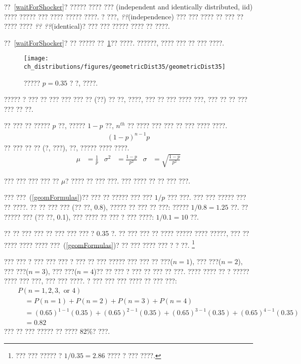 ??~\ref{waitForShocker}? ????? ???? ??? (independent and identically distributed, iid) ???? ????? ??? ???? ????? ????. ? ???, \emph{??}(independence) ??? ??? ???? ?? ??? ?? ???? ???? \emph{?? ??}(identical)? ??? ??? ????? ???? ?? ????.

??~\ref{waitForShocker}? ?? ????? ??~\ref{geometricDist35}?? ????. ??????, ???? ??? ?? ??? ????.

\begin{figure}
\centering
\texttt{[image: ch\_distributions/figures/geometricDist35/geometricDist35]}
\caption{????? $p=0.35$ ? ?, ????.}
\label{geometricDist35}
\end{figure}

????? ? ??? ?? ??? ??? ??? ?? (??) ?? ??, ????, ??? ?? ??? ???? ???, ??? ?? ?? ??? ??? ?? ??.

\begin{termBox}{
?? ??? ?? ????? $p$ ??, ????? $1-p$ ??, $n^{th}$ ?? ???? ??? ??? ?? ??? ???? ????.\vspace{-1.5mm}
\begin{eqnarray}
(1-p)^{n-1}p
\end{eqnarray}
?? ??? ?? ?? (?, ???), ??, ????? ???? ????.\vspace{-2.5mm}
\begin{align}
\mu &= \frac{1}{p}
	&\sigma^2&=\frac{1-p}{p^2}
	&\sigma &= \sqrt{\frac{1-p}{p^2}}
\label{geomFormulas}
\end{align}}
\end{termBox}

??? ??? ??? ??? ?? $\mu$? ???? ?? ??? ???. ??? ???? ?? ?? ??? ???.

??? ???~(\ref{geomFormulas})?? ??? ?? ????? ??? ??? $1/p$ ??? ???. ??? ??? ????? ??? ?? ????. ?? ?? ??? ??? (?? ??, 0.8), ????? ?? ??? ?? ???: ????? $1/0.8 = 1.25$ ??. ?? ????? ??? (?? ??, 0.1), ??? ???? ?? ??? ? ??? ????: $1/0.1 = 10$ ??.

\begin{exercise}
?? ?? ??? ??? ?? ??? ??? ??? ? 0.35 ?. ?? ??? ??? ?? ???? ????? ???? ?????, ??? ?? ???? ???? ???? ???~(\ref{geomFormulas})? ?? ??? ???? ??? ? ? ??.
\footnote{??? ??? ????? ? $1/0.35 = 2.86$ ???? ? ??? ????.}
\end{exercise}

\begin{example}{
??? ??? ? ??? ??? ??? ? ??? ?? ??? ?????} \label{marglimFirstSuccessIn4}
??? ??? ?? ???($n=1$), ??? ???($n=2$), ??? ???($n=3$), ??? ???($n=4$)?? ?? ??? ? ??? ?? ??? ?? ???. ???? ???? ?? ? ????? ???? ??? ???, ??? ??? ????. ? ??? ??? ??? ???? ?? ??? ???:
\begin{eqnarray*}
&&P(n=1, 2, 3,\text{ or }4) \\
	&& \quad = P(n=1)+P(n=2)+P(n=3)+P(n=4) \\
	&& \quad = (0.65)^{1-1}(0.35) + (0.65)^{2-1}(0.35) + (0.65)^{3-1}(0.35) + (0.65)^{4-1}(0.35) \\
	&& \quad = 0.82
\end{eqnarray*}
??? ?? ??? ????? ?? ???? 82\%? ???.
\end{example}

